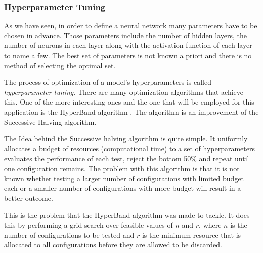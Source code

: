 \subsubsection{Hyperparameter Tuning}

As we have seen, in order to define a neural network many parameters have to be chosen in advance. Those parameters include the number of hidden layers, the number of neurons in each layer along with the activation function of each layer to name a few. The best set of parameters is not known a priori and there is no method of selecting the
optimal set.

The process of optimization of a model's hyperparameters is called \emph{hyperparameter tuning}. There are many optimization algorithms that achieve this. One of the more interesting ones and the one that will be employed for this application is the HyperBand algorithm \cite{li2018hyperbandnovelbanditbasedapproach}. The algorithm is an improvement of the Successive Halving
algorithm.

The Idea behind the Successive halving algorithm is quite simple. It uniformly allocates a budget of resources (computational time) to a set of hyperparameters evaluates the performance of each test, reject the bottom 50\% and repeat until one configuration remains. The problem with this algorithm is that it is not known whether testing a larger number of configurations with limited budget each or a smaller number of configurations with more budget will result in a better outcome.

This is the problem that the HyperBand algorithm was made to tackle. It does this by performing a grid search over feasible values of $n$ and $r$, where $n$ is the number of configurations to be tested and $r$ is the minimum resource that is allocated to all configurations before they are allowed to be discarded.